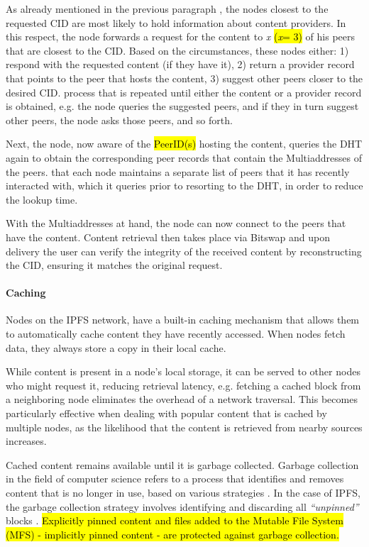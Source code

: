 As already mentioned in the previous paragraph , the nodes closest to the requested CID are most likely to hold information about content providers. In this respect, the node forwards a request for the content to \textit{x} \hl{(\textit{x}= 3)} of his peers that are closest to the CID. Based on the circumstances, these nodes either: 1) respond with the requested content (if they have it), 2) return a provider record that points to the peer that hosts the content,  3) suggest other peers closer to the desired CID.  process that is repeated until either the content or a provider record is obtained, e.g.\add{,} the node queries the suggested peers, and if they in turn suggest other peers, the node asks those peers, and so forth.

Next, the node, now aware of the \hl{PeerID(s)} hosting the content, queries the DHT again to obtain the corresponding peer records that contain the Multiaddresses of the peers.  that each node maintains a separate list of peers that it has recently interacted with, which it queries prior to resorting to the DHT, in order to reduce the lookup time.

With the Multiaddresses at hand, the node can now connect to the peers that have the content. Content retrieval then takes place via Bitswap and upon delivery the user can verify the integrity of the received content by reconstructing the CID, ensuring it matches the original request.

\paragraph{Caching}\label{par:caching_ipfs}
Nodes on the IPFS network, have a built-in caching mechanism that allows them to automatically cache content they have recently accessed. When nodes fetch data, they always store a copy in their local cache.

While content is present in a node's local storage, it can be served to other nodes who might request it, reducing retrieval latency, e.g.\add{,} fetching a cached block from a neighboring node eliminates the overhead of a network traversal. This  becomes particularly effective when dealing with popular content that is cached by multiple nodes, as the likelihood that the content is retrieved from nearby sources increases.

Cached content remains available until it is garbage collected. Garbage collection in the field of computer science refers to a process that identifies and removes content that is no longer in use, based on various strategies \citep{gc_2023}. In the case of IPFS, the garbage collection strategy involves identifying and discarding all \emph{``unpinned''} blocks \citep{ipfs_docs_2}. \hl{Explicitly pinned content and files added to the Mutable File System (MFS) - implicitly pinned content - are protected against garbage collection.}

